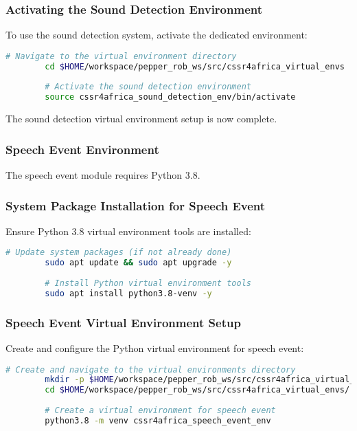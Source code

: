 \documentclass{CSSRforAfrica}
\begin{document}
{		\subsubsection*{Activating the Sound Detection Environment}
		To use the sound detection system, activate the dedicated environment:
		\begin{lstlisting}[style=withoutNumbering, language=bash]
		# Navigate to the virtual environment directory
		cd $HOME/workspace/pepper_rob_ws/src/cssr4africa_virtual_envs
		
		# Activate the sound detection environment
		source cssr4africa_sound_detection_env/bin/activate
		\end{lstlisting}
		
		The sound detection virtual environment setup is now complete.
		
		\subsubsection*{Speech Event Environment}
		The speech event module requires Python 3.8.
		
		\subsubsection*{System Package Installation for Speech Event}
		Ensure Python 3.8 virtual environment tools are installed:
		\begin{lstlisting}[style=withoutNumbering, language=bash]
		# Update system packages (if not already done)
		sudo apt update && sudo apt upgrade -y
		
		# Install Python virtual environment tools
		sudo apt install python3.8-venv -y
		\end{lstlisting}
		
		\subsubsection*{Speech Event Virtual Environment Setup}
		Create and configure the Python virtual environment for speech event:
		\begin{lstlisting}[style=withoutNumbering, language=bash]
		# Create and navigate to the virtual environments directory
		mkdir -p $HOME/workspace/pepper_rob_ws/src/cssr4africa_virtual_envs/
		cd $HOME/workspace/pepper_rob_ws/src/cssr4africa_virtual_envs/
		
		# Create a virtual environment for speech event
		python3.8 -m venv cssr4africa_speech_event_env
		

\end{lstlisting}}
\end{document}
